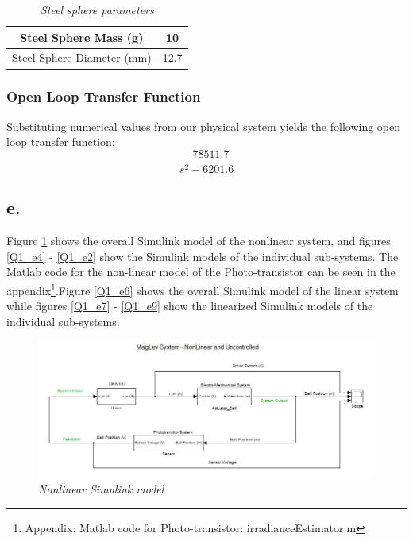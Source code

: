 \documentclass{article}
\theoremstyle{plain}
\theoremstyle{definition}
\theoremstyle{remark}
\begin{document}
\begin{table}[hbt]
\begin{center}
    \begin{tabular}{|c|c|}
        \hline
        Steel Sphere Mass (g)      & 10   \\ \hline
        Steel Sphere Diameter (mm) & 12.7 \\
        \hline
    \end{tabular}
\caption{\emph{Steel sphere parameters}}
\label{Q1_dt5}
\end{center}
\end{table}

\subsubsection*{Open Loop Transfer Function}
Substituting numerical values from our physical system yields the following open loop transfer function:
$$ \frac{-78511.7}{s^2 - 6201.6} $$

\subsection*{e.}
Figure \ref{Q1_e1}  shows the overall Simulink model of the nonlinear system, and figures \ref{Q1_e4} - \ref{Q1_e2} show the Simulink models of the individual sub-systems. The Matlab code for the non-linear model of the Photo-transistor can be seen in the appendix\footnote{Appendix: Matlab code for Photo-transistor: irradianceEstimator.m }.Figure \ref{Q1_e6}  shows the overall Simulink model of the linear system while figures \ref{Q1_e7} - \ref{Q1_e9} show the linearized Simulink models of the individual sub-systems.\\
\begin{figure}
\begin{center}
\includegraphics[width = 15cm]{NonLinearUnControlledComplete.jpg}
\caption{\emph{Nonlinear Simulink model}}
\label{Q1_e1}
\end{center}
\end{figure}
\end{document}
